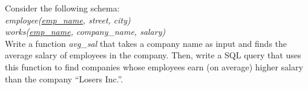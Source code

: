 \documentclass[a4 paper]{article}
\begin{document}
Consider the following schema:\\
\emph{employee(\underline{emp\_name}, street, city)}\\
\emph{works(\underline{emp\_name}, company\_name, salary)}\\
Write a function \emph{avg\_sal} that takes a company name as input and finds the average salary of employees in the company. Then, write a SQL query that uses this function to find companies whose employees earn (on average) higher salary than the company ``Losers Inc.''.
\end{document}
